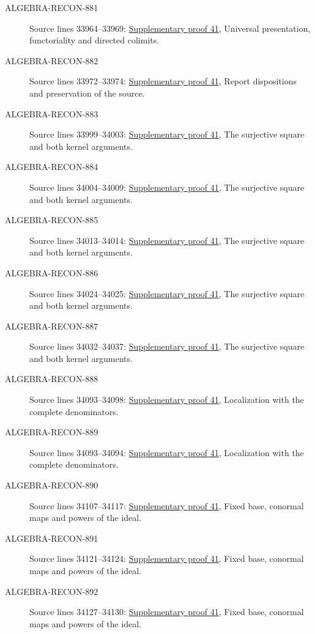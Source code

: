 \begin{description}
\item[ALGEBRA-RECON-881] Source lines 33964--33969: \hyperlink{algebra_differentials_notes_20260928}{Supplementary proof 41}, Universal presentation, functoriality and directed colimits.
\item[ALGEBRA-RECON-882] Source lines 33972--33974: \hyperlink{algebra_differentials_notes_20260928}{Supplementary proof 41}, Report dispositions and preservation of the source.
\item[ALGEBRA-RECON-883] Source lines 33999--34003: \hyperlink{algebra_differentials_notes_20260928}{Supplementary proof 41}, The surjective square and both kernel arguments.
\item[ALGEBRA-RECON-884] Source lines 34004--34009: \hyperlink{algebra_differentials_notes_20260928}{Supplementary proof 41}, The surjective square and both kernel arguments.
\item[ALGEBRA-RECON-885] Source lines 34013--34014: \hyperlink{algebra_differentials_notes_20260928}{Supplementary proof 41}, The surjective square and both kernel arguments.
\item[ALGEBRA-RECON-886] Source lines 34024--34025: \hyperlink{algebra_differentials_notes_20260928}{Supplementary proof 41}, The surjective square and both kernel arguments.
\item[ALGEBRA-RECON-887] Source lines 34032--34037: \hyperlink{algebra_differentials_notes_20260928}{Supplementary proof 41}, The surjective square and both kernel arguments.
\item[ALGEBRA-RECON-888] Source lines 34093--34098: \hyperlink{algebra_differentials_notes_20260928}{Supplementary proof 41}, Localization with the complete denominators.
\item[ALGEBRA-RECON-889] Source lines 34093--34094: \hyperlink{algebra_differentials_notes_20260928}{Supplementary proof 41}, Localization with the complete denominators.
\item[ALGEBRA-RECON-890] Source lines 34107--34117: \hyperlink{algebra_differentials_notes_20260928}{Supplementary proof 41}, Fixed base, conormal maps and powers of the ideal.
\item[ALGEBRA-RECON-891] Source lines 34121--34124: \hyperlink{algebra_differentials_notes_20260928}{Supplementary proof 41}, Fixed base, conormal maps and powers of the ideal.
\item[ALGEBRA-RECON-892] Source lines 34127--34130: \hyperlink{algebra_differentials_notes_20260928}{Supplementary proof 41}, Fixed base, conormal maps and powers of the ideal.

\end{description}
